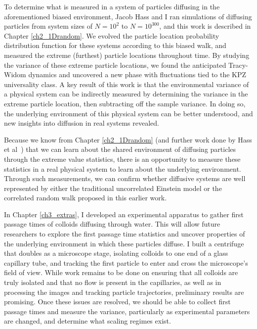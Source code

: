To determine what is measured in a system of particles diffusing in the aforementioned biased environment, Jacob Hass and I ran simulations of diffusing particles from system sizes of $N=10^2$ to $N=10^{300}$, and this work is described in Chapter \ref{ch2_1Drandom}. We evolved the particle location probability distribution function for these systems according to this biased walk, and measured the extreme (furthest) particle locations throughout time. By studying the variance of these extreme particle locations, we found the anticipated Tracy-Widom dynamics and uncovered a new phase with fluctuations tied to the KPZ universality class. A key result of this work is that the environmental variance of a physical system can be indirectly measured by determining the variance in the extreme particle location, then subtracting off the sample variance. In doing so, the underlying environment of this physical system can be better understood, and new insights into diffusion in real systems revealed.

Because we know from Chapter \ref{ch2_1Drandom} (and further work done by Hass et al~\cite{hass_first-passage_2024}) that we can learn about the shared environment of diffusing particles through the extreme value statistics, there is an opportunity to measure these statistics in a real physical system to learn about the underlying environment. Through such measurements, we can confirm whether diffusive systems are well represented by either the traditional uncorrelated Einstein model or the correlated random walk proposed in this earlier work.

In Chapter \ref{ch3_extras}, I developed an experimental apparatus to gather first passage times of colloids diffusing through water. This will allow future researchers to explore the first passage time statistics and uncover properties of the underlying environment in which these particles diffuse. I built a centrifuge that doubles as a microscope stage, isolating colloids to one end of a glass capillary tube, and tracking the first particle to enter and cross the microscope's field of view. While work remains to be done on ensuring that all colloids are truly isolated and that no flow is present in the capillaries, as well as in processing the images and tracking particle trajectories, preliminary results are promising. Once these issues are resolved, we should be able to collect first passage times and measure the variance, particularly as experimental parameters are changed, and determine what scaling regimes exist.


